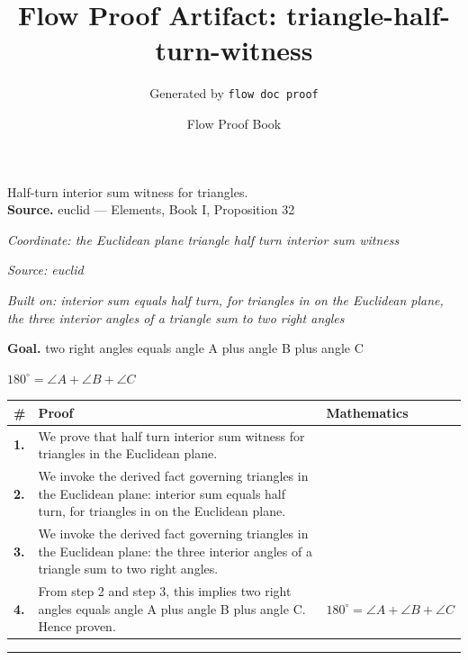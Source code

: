 \documentclass[11pt]{article}
\title{Flow Proof Artifact: triangle-half-turn-witness}
\author{Generated by \texttt{flow doc proof}}
\date{Flow Proof Book}
\theoremstyle{definition}
\begin{document}
\maketitle
Half-turn interior sum witness for triangles.\\[0.5em]
\textbf{Source.} euclid — Elements, Book I, Proposition 32\\[0.5em]
\bigskip
{}\par
\smallskip\noindent\textit{Coordinate: the Euclidean plane \cdot triangle \cdot half turn interior sum witness}\par
\smallskip\noindent\textit{Source: euclid}\par
\smallskip\noindent\textit{Built on: interior sum equals half turn, for triangles in on the Euclidean plane, the three interior angles of a triangle sum to two right angles}\par
\medskip
\noindent\textbf{Goal.} two right angles equals angle A plus angle B plus angle C\par
\noindent$\displaystyle 180^\circ = \angle A + \angle B + \angle C$\par
\medskip
\noindent
\begin{tabular}{@{} >{\raggedright\arraybackslash}p{} >{\raggedright\arraybackslash}p{} >{\raggedleft\arraybackslash}p{} @{}}
\textbf{\#} & \textbf{Proof} & \textbf{Mathematics} \\
\midrule
\textbf{1.} & We prove that half turn interior sum witness for triangles in the Euclidean plane. & \\[0.45em]
\textbf{2.} & We invoke the derived fact governing triangles in the Euclidean plane: interior sum equals half turn, for triangles in on the Euclidean plane. & \\[0.45em]
\textbf{3.} & We invoke the derived fact governing triangles in the Euclidean plane: the three interior angles of a triangle sum to two right angles. & \\[0.45em]
\textbf{4.} & From step 2 and step 3, this implies two right angles equals angle A plus angle B plus angle C. Hence proven. & $\displaystyle 180^\circ = \angle A + \angle B + \angle C$ \\[0.45em]
\bottomrule
\end{tabular}
\label{thm:Geometry-triangle-half_turn_interior_sum_witness}
\par\medskip\hrule
\end{document}
